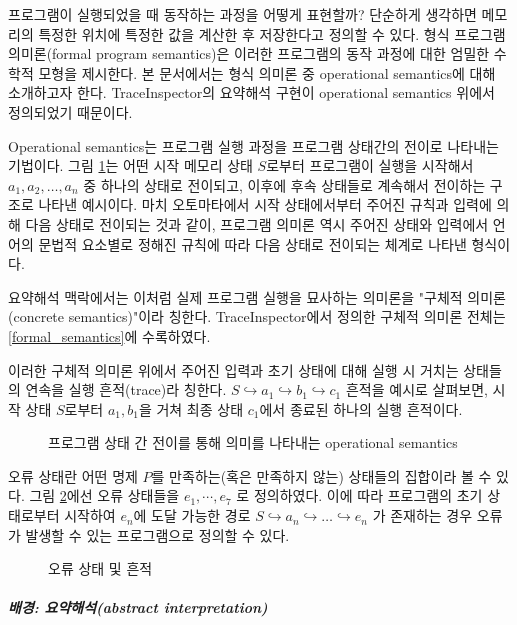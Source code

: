 \documentclass[a4paper,12pt]{article}
\begin{document}
프로그램이 실행되었을 때 동작하는 과정을 어떻게 표현할까? 단순하게 생각하면 메모리의 특정한 위치에 특정한 값을 계산한 후 저장한다고 정의할 수 있다. 형식 프로그램 의미론(formal program semantics)은
이러한 프로그램의 동작 과정에 대한 엄밀한 수학적 모형을 제시한다. 본 문서에서는 형식 의미론 중 operational semantics에 대해 소개하고자 한다. 
\textsf{TraceInspector}의 요약해석 구현이 operational semantics 위에서 정의되었기 때문이다.

Operational semantics는 프로그램 실행 과정을 프로그램 상태간의 전이로 나타내는 기법이다. 그림 \ref{fig:trace}는 어떤 시작 메모리 상태 $S$로부터 프로그램이 실행을 시작해서
$a_1, a_2, \ldots, a_n$ 중 하나의 상태로 전이되고, 이후에 후속 상태들로 계속해서 전이하는 구조로 나타낸 예시이다. 마치 오토마타에서 시작 상태에서부터 
주어진 규칙과 입력에 의해 다음 상태로 전이되는 것과 같이, 프로그램 의미론 역시 주어진 상태와 입력에서 언어의 문법적 요소별로 정해진 규칙에 따라 다음 상태로 전이되는 체계로 
나타낸 형식이다. 

요약해석 맥락에서는 이처럼 실제 프로그램 실행을 묘사하는 의미론을 "구체적 의미론(concrete semantics)"이라 칭한다. 
\textsf{TraceInspector}에서 정의한 구체적 의미론 전체는 \ref{formal_semantics}에 수록하였다.

이러한 구체적 의미론 위에서 주어진 입력과 초기 상태에 대해 실행 시 거치는 상태들의 연속을 실행 흔적(trace)라 칭한다.
$S \hookrightarrow a_1 \hookrightarrow b_1 \hookrightarrow c_1$ 흔적을 예시로 살펴보면, 시작 상태 $S$로부터 $a_1, b_1$을 거쳐 최종 상태 $c_1$에서 종료된 하나의 실행 흔적이다.

\begin{figure}[h]
    \centering
    
    \caption{프로그램 상태 간 전이를 통해 의미를 나타내는 operational semantics}
    \label{fig:trace}
\end{figure}

오류 상태란 어떤 명제 $P$를 만족하는(혹은 만족하지 않는) 상태들의 집합이라 볼 수 있다. 그림 \ref{fig:trace_error}에선 오류 상태들을 $e_1, \cdots ,e_7$ 로 정의하였다.
이에 따라 프로그램의 초기 상태로부터 시작하여 $e_n$에 도달 가능한 경로 $S \hookrightarrow a_n \hookrightarrow \ldots \hookrightarrow e_n$ 가 존재하는 경우 오류가 발생할 수 있는 프로그램으로 정의할 수 있다.

\begin{figure}[h]
    \centering
    
    \caption{오류 상태 및 흔적}
    \label{fig:trace_error}
\end{figure}

\subparagraph{배경: 요약해석(abstract interpretation)} ~\\
\end{document}
